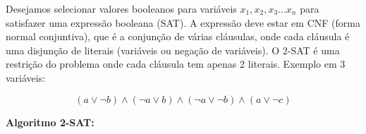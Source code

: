  Desejamos selecionar valores booleanos para variáveis $x_1, x_2, x_3... x_n$ para satisfazer uma 
expressão booleana (SAT). A expressão deve estar em CNF (forma normal conjuntiva), que é a conjunção de várias cláusulas,
onde cada cláusula é uma disjunção de literais (variáveis ou negação de variáveis). O 2-SAT é uma restrição do problema onde
cada cláusula tem apenas 2 literais. Exemplo em 3 variáveis:

\[ (a \lor \neg b) \land (\neg a \lor b)\land (\neg a \lor \neg b) \land (a \lor \neg c) \]

\textbf{Algoritmo 2-SAT:}
\begin{lstlisting}[language=C++, breaklines=true]

\end{lstlisting}

